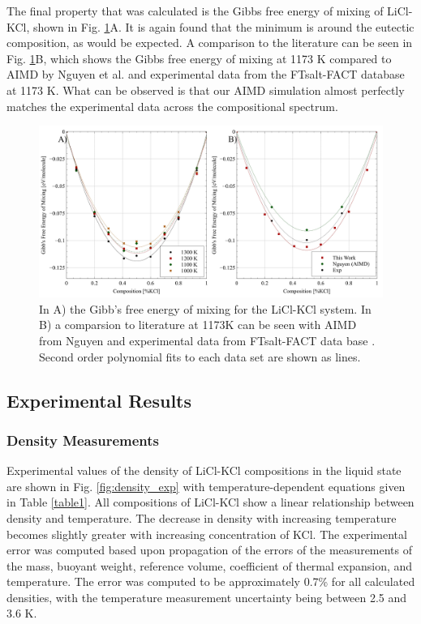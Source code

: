 \documentclass[review]{elsarticle}
\begin{document}
The final property that was calculated is the Gibbs free energy of mixing of LiCl-KCl, shown in Fig. \ref{fig:gibb}A. It is again found that the minimum is around the eutectic composition, as would be expected. A comparison to the literature can be seen in Fig. \ref{fig:gibb}B, which shows the Gibbs free energy of mixing at 1173 K compared to AIMD by Nguyen et al. \cite{NGUYEN2021} and experimental data from the FTsalt-FACT database \cite{FTsalt} at 1173 K. What can be observed is that our AIMD simulation almost perfectly matches the experimental data across the compositional spectrum.

\begin{figure}[h]
 \centering
 \includegraphics[width=1.0\textwidth]{images/gibbs_mixxing_combined.jpg} 
 \caption{In A) the Gibb's free energy of mixing for the LiCl-KCl system. In B) a comparsion to literature at 1173K can be seen with AIMD from Nguyen \cite{NGUYEN2021} and experimental data from FTsalt-FACT data base \cite{FTsalt}. Second order polynomial fits to each data set are shown as lines.}
 \label{fig:gibb}
\end{figure} 

\FloatBarrier

\subsection{Experimental Results}

\subsubsection{Density Measurements}

Experimental values of the density of LiCl-KCl compositions in the liquid state are shown in Fig. \ref{fig:density_exp} with temperature-dependent equations given in Table \ref{table1}. All compositions of LiCl-KCl show a linear relationship between density and temperature. The decrease in density with increasing temperature becomes slightly greater with increasing concentration of KCl. The experimental error was computed based upon propagation of the errors of the measurements of the mass, buoyant weight, reference volume, coefficient of thermal expansion, and temperature. The error was computed to be approximately 0.7\% for all calculated densities, with the temperature measurement uncertainty being between 2.5 and 3.6 K. 
\end{document}
